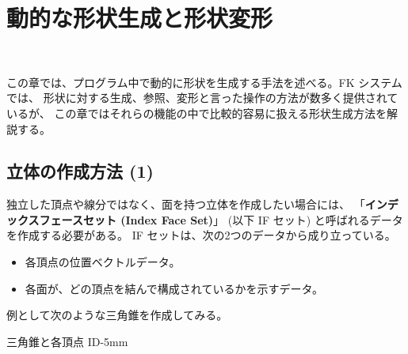 \chapter{動的な形状生成と形状変形} \label{sec:easygen} ~

この章では、プログラム中で動的に形状を生成する手法を述べる。FK システムでは、
形状に対する生成、参照、変形と言った操作の方法が数多く提供されているが、
この章ではそれらの機能の中で比較的容易に扱える形状生成方法を解説する。

\section{立体の作成方法 (1)} \label{subsec:solidGen1}
独立した頂点や線分ではなく、面を持つ立体を作成したい場合には、
「\textbf{インデックスフェースセット (Index Face Set)}」
(以下 IF セット) と呼ばれるデータを作成する必要がある。
IF セットは、次の2つのデータから成り立っている。
\begin{itemize}
 \item 各頂点の位置ベクトルデータ。
 \item 各面が、どの頂点を結んで構成されているかを示すデータ。
\end{itemize}
例として次のような三角錐を作成してみる。

	{三角錐と各頂点 ID}{-5mm}


